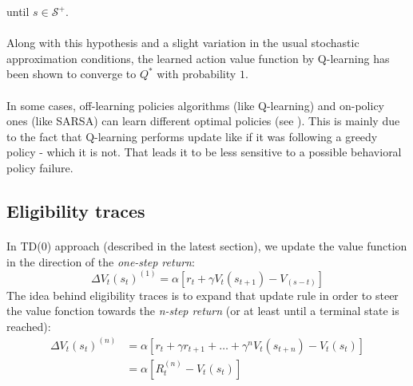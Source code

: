\documentclass[a4paper]{report}
\begin{document}
{{{{\begin{algorithm}[H]
							\Indm \Indm 
						until $s\in\mathcal{S}^+$.
						\Indm \Indm 
						\end{algorithm}
					}
				
				\paragraph{} Along with this hypothesis and a slight variation in the usual stochastic approximation conditions, the learned action value function by Q-learning has been shown to converge to $Q^*$ with probability $1$. 
				
				\paragraph{} In some cases, off-learning policies algorithms (like Q-learning) and on-policy ones (like SARSA) can learn different optimal policies (see \cite{Sutton98a}). This is mainly due to the fact that Q-learning performs update like if it was following a greedy policy - which it is not. That leads it to be less sensitive to a possible behavioral policy failure. 
			}
			\subsection{Eligibility traces}
			{
				\paragraph{} In TD(0) approach (described in the latest section), we update the value function in the direction of the \emph{one-step return}: 
				\begin{equation}
					\Delta V_t(s_t)^{(1)} = \alpha \left[ r_t + \gamma V_t(s_{t+1}) - V_(s-t)\right]
				\end{equation}
				The idea behind eligibility traces is to expand that update rule in order to steer the value fonction towards the \emph{n-step return} (or at least until a terminal state is reached):
				\begin{equation}
					\begin{aligned}
					\Delta V_t(s_t) ^{(n)} &= \alpha \left[ r_t + \gamma r_{t+1} + \hdots + \gamma^{n} V_t(s_{t+n})-V_t(s_t)\right]	\\
									&= \alpha \left[R_t^{(n)} - V_t(s_t)\right]
					\end{aligned}
				\end{equation}
				
}}}
\end{document}
